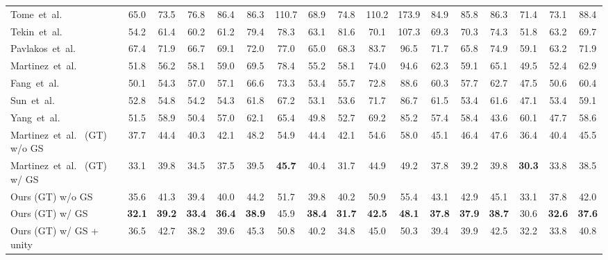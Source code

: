 \documentclass[10pt,twocolumn,letterpaper]{article}
\def\etal{et~al.\xspace}
\begin{document}
\begin{table*}[t]
\begin{center}
{\begin{tabular}{lcccccccccccccccc}
Tome~\etal~\cite{tome2017lifting}          & 65.0    & 73.5    & 76.8   & 86.4  & 86.3  & 110.7 & 68.9  & 74.8  & 110.2 & 173.9 & 84.9  & 85.8  & 86.3  & 71.4 & 73.1  & 88.4  \\  
Tekin~\etal~\cite{tekin2017learning}       & 54.2    & 61.4    & 60.2   & 61.2  & 79.4  & 78.3  & 63.1  & 81.6  & 70.1  & 107.3 & 69.3  & 70.3  & 74.3  & 51.8 & 63.2  & 69.7  \\  
Pavlakos~\etal~\cite{pavlakos2017coarse}   & 67.4    & 71.9    & 66.7   & 69.1  & 72.0  & 77.0  & 65.0  & 68.3  & 83.7  & 96.5  & 71.7  & 65.8  & 74.9  & 59.1 & 63.2  & 71.9  \\  
Martinez~\etal~\cite{martinez2017simple}   & 51.8    & 56.2    & 58.1   & 59.0  & 69.5  & 78.4  & 55.2  & 58.1  & 74.0  & 94.6  & 62.3  & 59.1  & 65.1  & 49.5 & 52.4  & 62.9  \\  
Fang~\etal~\cite{fang2017learning}         & 50.1    & 54.3    & 57.0   & 57.1  & 66.6  & 73.3  & 53.4  & 55.7  & 72.8  & 88.6  & 60.3  & 57.7  & 62.7  & 47.5 & 50.6  & 60.4  \\  
Sun~\etal~\cite{sun2017compositional}      & 52.8    & 54.8    & 54.2   & 54.3  & 61.8  & 67.2  & 53.1  & 53.6  & 71.7  & 86.7  & 61.5  & 53.4  & 61.6  & 47.1 & 53.4  & 59.1  \\  
Yang~\etal~\cite{yang20183d}               & 51.5    & 58.9    & 50.4   & 57.0  & 62.1  & 65.4  & 49.8  & 52.7  & 69.2  & 85.2  & 57.4  & 58.4  & 43.6  & 60.1 & 47.7  & 58.6  \\ \midrule
Martinez~\etal~\cite{martinez2017simple} (GT) w/o GS         & 37.7    & 44.4    & 40.3   & 42.1  & 48.2  & 54.9  & 44.4  & 42.1  & 54.6  & 58.0  & 45.1  & 46.4  & 47.6  & 36.4 & 40.4  & 45.5  \\
Martinez~\etal~\cite{martinez2017simple} (GT) w/ GS          & 33.1    & 39.8    & 34.5   & 37.5  & 39.5  &\textbf{45.7}  & 40.4  & 31.7  & 44.9  & 49.2  & 37.8  & 39.2  & 39.8  & \textbf{30.3} & 33.8  & 38.5  \\
Ours (GT) w/o GS                           & 35.6    & 41.3    & 39.4   & 40.0  & 44.2  & 51.7  & 39.8  & 40.2  & 50.9  & 55.4  & 43.1  & 42.9  & 45.1  & 33.1 & 37.8  & 42.0  \\
Ours (GT) w/ GS & \textbf{32.1} & \textbf{39.2} & \textbf{33.4} & \textbf{36.4} & \textbf{38.9} & 45.9 & \textbf{38.4} & \textbf{31.7} & \textbf{42.5} & \textbf{48.1} & \textbf{37.8} & \textbf{37.9} & \textbf{38.7} & 30.6 & \textbf{32.6} & \textbf{37.6} \\ \midrule
Ours (GT) w/ GS + unity         & 36.5    & 42.7   & 38.2   & 39.6   & 45.3  & 50.8  & 40.2  & 34.8  & 45.0  & 50.3  & 39.4  & 39.9  & 42.5  & 32.2 & 33.8  & 40.8  \\\bottomrule

\end{tabular}}
\vspace{-6mm}
\end{center}
\end{table*}
\end{document}
